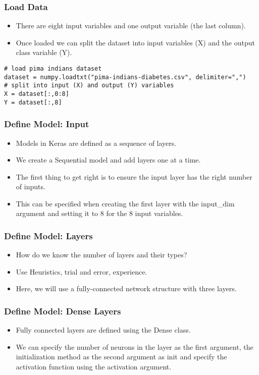 \begin{frame}[fragile] \frametitle{Load Data}
 \begin{itemize}
\item  There are eight input variables and one output variable (the last column).
\item Once loaded we can split the dataset into input variables (X) and the output class variable (Y).
\end{itemize}
\begin{lstlisting}
# load pima indians dataset
dataset = numpy.loadtxt("pima-indians-diabetes.csv", delimiter=",")
# split into input (X) and output (Y) variables
X = dataset[:,0:8]
Y = dataset[:,8]
\end{lstlisting}
\end{frame}

\begin{frame}[fragile] \frametitle{Define Model: Input}
 \begin{itemize}
\item  Models in Keras are defined as a sequence of layers.
\item We create a Sequential model and add layers one at a time.
\item The first thing to get right is to ensure the input layer has the right number of inputs. 
\item This can be specified when creating the first layer with the input\_dim argument and setting it to 8 for the 8 input variables.
\end{itemize}
\end{frame}

\begin{frame}[fragile] \frametitle{Define Model: Layers}
 \begin{itemize}
\item  How do we know the number of layers and their types?
\item Use Heuristics, trial and error, experience.
\item Here, we will use a fully-connected network structure with three layers.

\end{itemize}
\end{frame}


\begin{frame}[fragile] \frametitle{Define Model: Dense Layers}
 \begin{itemize}
\item  Fully connected layers are defined using the Dense class. 
\item We can specify the number of neurons in the layer as the first argument, the initialization method as the second argument as init and specify the activation function using the activation argument.
\end{itemize}
\end{frame}



